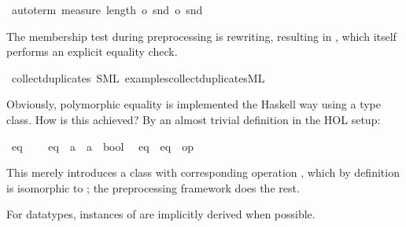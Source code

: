 \begin{isabellebody}
\ {\isacharparenleft}auto{\isacharunderscore}term\ {\isachardoublequoteopen}measure\ {\isacharparenleft}length\ o\ snd\ o\ snd{\isacharparenright}{\isachardoublequoteclose}{\isacharparenright}%
\endisatagproof
{\isafoldproof}%
%
\isadelimproof
%
\endisadelimproof
%
\begin{isamarkuptext}%
The membership test during preprocessing is rewriting,
  resulting in , which itself
  performs an explicit equality check.%
\end{isamarkuptext}%
\isamarkuptrue%
\isamarkupfalse%
\ collect{\isacharunderscore}duplicates\ {\isacharparenleft}SML\ {\isachardoublequoteopen}examples{\isacharslash}collect{\isacharunderscore}duplicates{\isachardot}ML{\isachardoublequoteclose}{\isacharparenright}%
\begin{isamarkuptext}%
%
\end{isamarkuptext}%
\isamarkuptrue%
%
\begin{isamarkuptext}%
Obviously, polymorphic equality is implemented the Haskell
  way using a type class.  How is this achieved?  By an
  almost trivial definition in the HOL setup:%
\end{isamarkuptext}%
\isamarkuptrue%
%
\isadelimML
%
\endisadelimML
%
\isatagML
%
\endisatagML
{\isafoldML}%
%
\isadelimML
\isanewline
%
\endisadelimML
{}\isamarkupfalse%
\ eq\ {\isacharequal}\isanewline
\ \ \ eq\ {\isacharcolon}{\isacharcolon}\ {\isachardoublequoteopen}{\isacharprime}a\ {\isasymRightarrow}\ {\isacharprime}a\ {\isasymRightarrow}\ bool{\isachardoublequoteclose}\isanewline
\isanewline
{}\isamarkupfalse%
\isanewline
\ \ eq\ {\isacharcolon}\ {\isachardoublequoteopen}eq\ {\isasymequiv}\ {\isacharparenleft}op\ {\isacharequal}{\isacharparenright}{\isachardoublequoteclose}%
\begin{isamarkuptext}%
This merely introduces a class  with corresponding
  operation , which by definition is isomorphic
  to ; the preprocessing framework does the rest.%
\end{isamarkuptext}%
\isamarkuptrue%
%
\isadelimML
%
\endisadelimML
%
\isatagML
%
\endisatagML
{\isafoldML}%
%
\isadelimML
%
\endisadelimML
%
\begin{isamarkuptext}%
For datatypes, instances of  are implicitly derived
  when possible.


\end{isamarkuptext}
\end{isabellebody}
